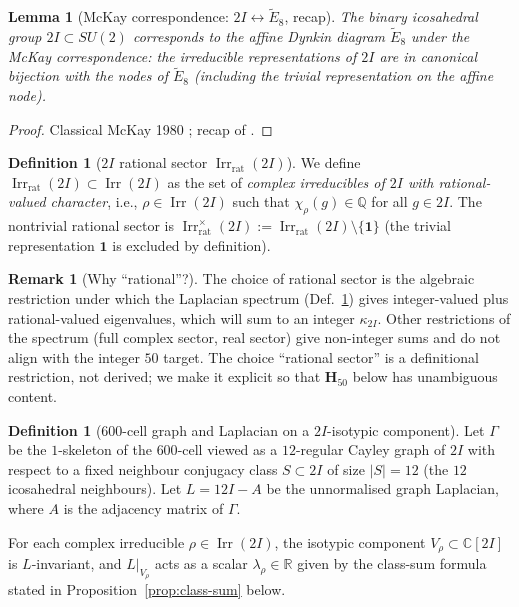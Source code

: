 \documentclass[11pt, a4paper]{amsart}
\newtheorem{lemma}[theorem]{Lemma}
\theoremstyle{definition}
\newtheorem{definition}[theorem]{Definition}
\newtheorem{remark}[theorem]{Remark}
\newcommand{\R}{\mathbb{R}}
\newcommand{\C}{\mathbb{C}}
\newcommand{\Q}{\mathbb{Q}}
\newcommand{\Irr}{\operatorname{Irr}}
\newcommand{\Hfifty}{\mathbf{H}_{50}}
\newcommand{\kappaTwoI}{\kappa_{2I}}
\newcommand{\Irrrat}{\Irr_{\mathrm{rat}}}
\begin{document}
\begin{lemma}[McKay correspondence: $2I \leftrightarrow
  \widetilde{E}_8$, recap]
\label{lem:McKay-recap}
The binary icosahedral group $2I \subset SU(2)$ corresponds
to the affine Dynkin diagram $\widetilde{E}_8$ under the
McKay correspondence: the irreducible representations of
$2I$ are in canonical bijection with the nodes of
$\widetilde{E}_8$ (including the trivial representation on
the affine node).
\end{lemma}

\begin{proof}
Classical McKay 1980 \cite[\S 3, pp.~183--186]{McKay80};
recap of \cite[Lem.~lem:McKay]{CascadePhasonCoxeter}.
\end{proof}

\begin{definition}[$2I$ rational sector $\Irrrat(2I)$]
\label{def:Irr-rat}
We define $\Irrrat(2I) \subset \Irr(2I)$ as the set of
\emph{complex irreducibles of $2I$ with rational-valued
character}, i.e., $\rho \in \Irr(2I)$ such that
$\chi_\rho(g) \in \Q$ for all $g \in 2I$. The nontrivial
rational sector is $\Irrrat^\times(2I) := \Irrrat(2I)
\setminus \{\mathbf{1}\}$ (the trivial representation
$\mathbf{1}$ is excluded by definition).
\end{definition}

\begin{remark}[Why ``rational''?]
\label{rmk:Irr-rat-justif}
The choice of rational sector is the algebraic restriction
under which the Laplacian spectrum (Def.~\ref{def:Lambda})
gives integer-valued plus rational-valued eigenvalues, which
will sum to an integer $\kappaTwoI$. Other restrictions of
the spectrum (full complex sector, real sector) give
non-integer sums and do not align with the integer $50$
target. The choice ``rational sector'' is a definitional
restriction, not derived; we make it explicit so that
$\Hfifty$ below has unambiguous content.
\end{remark}

\begin{definition}[$600$-cell graph and Laplacian on a
  $2I$-isotypic component]
\label{def:Lambda}
Let $\Gamma$ be the $1$-skeleton of the $600$-cell viewed as
a $12$-regular Cayley graph of $2I$ with respect to a fixed
neighbour conjugacy class $S \subset 2I$ of size $|S| = 12$
(the $12$ icosahedral neighbours). Let $L = 12 I - A$
be the unnormalised graph Laplacian, where $A$ is the
adjacency matrix of $\Gamma$.

For each complex irreducible $\rho \in \Irr(2I)$, the
isotypic component $V_\rho \subset \C[2I]$ is
$L$-invariant, and $L|_{V_\rho}$ acts as a scalar
$\lambda_\rho \in \R$ given by the class-sum formula stated
in Proposition~\ref{prop:class-sum} below.
\end{definition}
\end{document}
